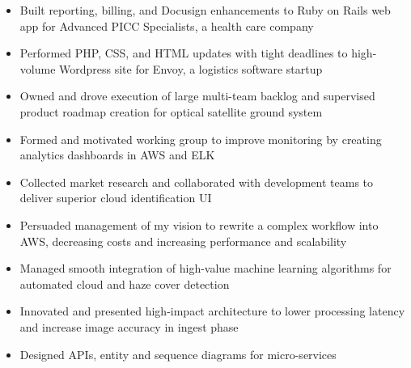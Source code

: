 \documentclass[10pt,a4paper,ragged2e,withhyper]{altacv}
\begin{document}


\makecvheader



\begin{paracol}{2}


\begin{itemize}
\item Built reporting, billing, and Docusign enhancements to Ruby on Rails web app for Advanced PICC Specialists, a health care company
\item Performed PHP, CSS, and HTML updates with tight deadlines to high-volume Wordpress site for Envoy, a logistics software startup
\end{itemize}

\divider

\begin{itemize}
\item Owned and drove execution of large multi-team backlog and supervised product roadmap creation for optical satellite ground system
\item Formed and motivated working group to improve monitoring by creating analytics dashboards in AWS and ELK
\end{itemize}

\divider


\begin{itemize}
\item Collected market research and collaborated with development teams to deliver superior cloud identification UI
\item Persuaded management of my vision to rewrite a complex workflow into AWS, decreasing costs and increasing performance and scalability
\item Managed smooth integration of high-value machine learning algorithms for automated cloud and haze cover detection
\item Innovated and presented high-impact architecture to lower processing latency and increase image accuracy in ingest phase
\item Designed APIs, entity and sequence diagrams for micro-services
\end{itemize}


\end{paracol}
\end{document}
